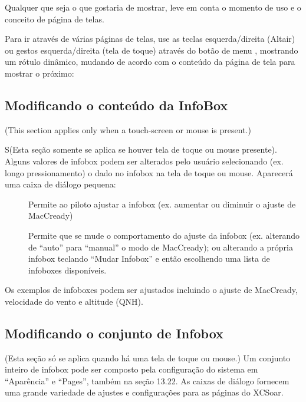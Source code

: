 Qualquer que seja o que gostaria de mostrar, leve em conta o momento de uso e o conceito de página de telas.

Para ir através de várias páginas de telas, use as teclas esquerda/direita (Altair) ou gestos esquerda/direita (tela de toque) através do botão de menu , mostrando um rótulo dinâmico, mudando de acordo com o conteúdo da página de tela para mostrar o próximo:

\blink{}\blink{}\blink{}\blink{}


\subsection*{Modificando o conteúdo da InfoBox }

(This section applies only when a touch-screen or mouse is present.)

S(Esta seção somente se aplica se houver tela de toque ou mouse presente).  Alguns valores de infobox podem ser alterados pelo usuário selecionando (ex. longo pressionamento) o dado no infobox na tela de toque ou mouse.  Aparecerá uma caixa de diálogo pequena:

\begin{description}
\item[]  
Permite ao piloto ajustar a infobox (ex. aumentar ou diminuir o ajuste de MacCready)

\item[]
 Permite que se mude o comportamento do ajuste da infobox (ex. alterando de “auto” para “manual” o modo de MacCready); ou alterando a própria infobox teclando “Mudar Infobox” e então escolhendo uma lista de infoboxes disponíveis.

\end{description}

Os exemplos de infoboxes podem ser ajustados incluindo o ajuste de MacCready, velocidade do vento e altitude (QNH).


\subsection*{Modificando o conjunto de Infobox}

(Esta seção só se aplica quando há uma tela de toque ou mouse.)
Um conjunto inteiro de infobox pode ser composto pela configuração do sistema em “Aparência” e “Pages”, também na seção 13.22.  As caixas de diálogo fornecem uma grande variedade de ajustes e configurações para as páginas do XCSoar.


